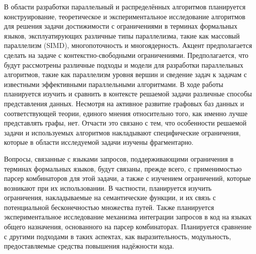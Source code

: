 \documentclass[12pt]{article}  %
\theoremstyle{remark}
\begin{document}
В области разработки параллельный и распределённых алгоритмов планируется конструирование, теоретическое и экспериментальное исследование алгоритмов для решения задачи достижимости с ограничениями в терминах формальных языков, эксплуатирующих различные типы параллелизма, такие как массовый параллелизм (SIMD), многопоточность и многоядерность. Акцент предполагается сделать на задаче с контекстно-свободными ограничениями. Предполагается, что будут рассмотрены различные подходы и модели для разработки параллельных алгоритмов, такие как параллелизм уровня вершин и сведение задач к задачам с известными эффективными параллельными алгоритмами. В ходе работы планируется изучить и сравнить в контексте решаемой задачи различные способы представления данных. Несмотря на активное развитие графовых баз данных и соответствующей теории, единого мнения относительно того, как именно лучше представлять графы, нет. Отчасти это связано с тем, что особенности решаемой задачи и используемых алгоритмов накладывают специфические ограничения, которые в области исследуемой задачи изучены фрагментарно.

Вопросы, связанные с языками запросов, поддерживающими ограничения в терминах формальных языков, будут связаны, прежде всего, с применимостью парсер комбинаторов для этой задачи, а также с изучением ограничений, которые возникают при их использовании.
В частности, планируется изучить ограничения, накладываемые на семантические функции, и их связь с потенциальной бесконечностью множества путей.
Также планируется экспериментальное исследование механизма интеграции запросов в код на языках общего назначения, основанного на парсер комбинаторах. Планируется сравнение с другими подходами в таких аспектах, как выразительность, модульность, предоставляемые средства повышения надёжности кода.
\end{document}
